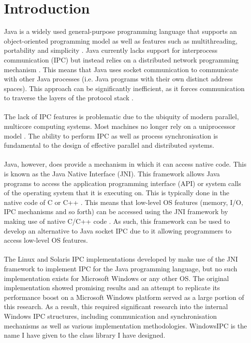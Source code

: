 \documentclass[12pt] {newrucsthesis}    %
\begin{document}
  \tableofcontents
    \newpage

  \listoffigures
    \newpage

  \listoftables
    \newpage

  \lstlistoflistings
    \newpage


  \chapter{Introduction}
      Java is a widely used general-purpose programming language that supports an object-oriented
      programming model as well as features such as multithreading, portability and simplicity \citep{JavaIntro}.
      Java currently lacks support for interprocess communication (IPC) but instead relies on a distributed network
      programming mechanism  \citep{WellsIPCMultiProc}.
      This means that Java uses socket communication to communicate with other Java processes (i.e. Java programs
      with their own distinct address spaces). This approach can be significantly inefficient, as it forces
      communication to traverse the layers of the protocol stack \citep{WellsIPCJava}.
      \\\\
      The lack of IPC features is problematic due to the ubiquity of modern parallel, multicore computing systems.
      Most machines no longer rely on a uniprocessor model \citep{hayes2007computing}.
      The ability to perform IPC as well as process synchronisation is fundamental to the design of effective
      parallel and distributed systems.
      \\\\
      Java, however, does provide a mechanism in which it can access native code. This is known as
      the Java Native Interface (JNI). This framework allows Java programs to access the application
      programming interface (API) or system calls of the operating system that it is executing on.
      This is typically done in the native code of C or C++ \citep{LiangJNISpecification}.
      This means that low-level OS features (memory, I/O, IPC mechanisms and so forth) can be accessed using the
      JNI framework by making use of native C/C++ code \citep{IBM2009}. As such, this framework can be
      used to develop an alternative to Java socket IPC due to it allowing programmers to access low-level
      OS features.
      \\\\
      The Linux and Solaris IPC implementations developed by \cite{WellsIPCJava} make use of the JNI framework
      to implement IPC for the Java programming language, but no such implementation exists for Microsoft Windows
      or any other OS. The original implementation showed promising results and an attempt to
      replicate its performance boost on a Microsoft Windows platform served as a large
      portion of this research. As a result, this required significant research into
      the internal Windows IPC structures, including communication and synchronisation mechanisms as well as various
      implementation methodologies. WindowsIPC is the name I have given to the class library I have designed.
\end{document}
